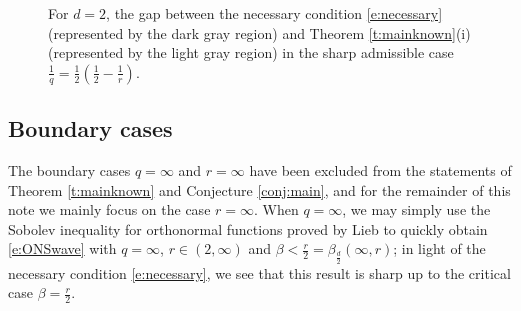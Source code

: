 \documentclass[a4paper]{amsart}
\numberwithin{equation}{section}%
\theoremstyle{plain}%
\theoremstyle{definition}
\theoremstyle{remark}%
\begin{document}
\begin{figure}
\begin{center}
\end{center}
\caption{For $d = 2$, the gap between the necessary condition \eqref{e:necessary} (represented by the dark gray region) and Theorem \ref{t:mainknown}(i) (represented by the light gray region) in the sharp admissible case $\frac{1}{q} = \frac{1}{2}(\frac{1}{2} - \frac{1}{r})$.}
\label{fig:2Dconj}
\end{figure}


\subsection{Boundary cases}\label{subsection:boundaryintro}

The boundary cases $q = \infty$ and $r = \infty$ have been excluded from the statements of Theorem \ref{t:mainknown} and Conjecture \ref{conj:main}, and for the remainder of this note we mainly focus on the case $r = \infty$. When $q = \infty$, we may simply use the Sobolev inequality for orthonormal functions proved by Lieb \cite{Lieb_Sobolev} to quickly obtain \eqref{e:ONSwave} with $q = \infty$, $r \in (2,\infty)$ and $\beta < \frac{r}{2} = \beta_{\frac{d}{2}}(\infty,r)$; in light of the necessary condition \eqref{e:necessary}, we see that this result is sharp up to the critical case $\beta = \frac{r}{2}$.
\end{document}
